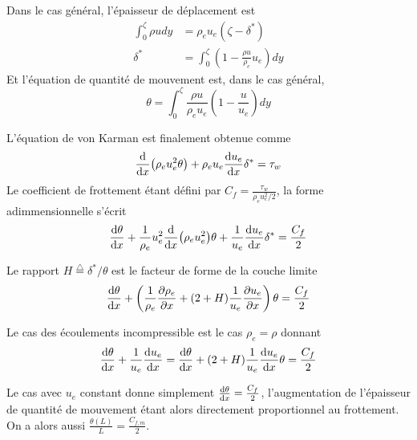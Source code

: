     Dans le cas général, l'épaisseur de déplacement est
    \begin{equation}
      \begin{aligned}
        \int_0^\zeta \rho u dy &= \rho_e u_e (\zeta - \delta^*)\\
        \delta^* &= \int_0^\zeta \left(1 - \frac{\rho u}{\rho_e}{u_e}\right)dy
      \end{aligned}
    \end{equation}
    Et l'équation de quantité de mouvement est, dans le cas général,
    \begin{equation}
      \theta = \int_0^\zeta \frac{\rho u}{\rho_e u_e} \left(1 - \frac{u}{u_e}\right) dy
    \end{equation}

    L'équation de von Karman est finalement obtenue comme
    \begin{equation}
      \dv{x}(\rho_e u_e^2 \theta) + \rho_e u_e \dv{u_e}{x} \delta^* = \tau_w
    \end{equation}
    Le coefficient de frottement étant défini par $C_f = \frac{\tau_w}{\rho_e u_e^2/2}$, la forme adimmensionnelle s'écrit
    \begin{equation}
      \dv{\theta}{x} + \frac{1}{\rho_e}{u_e^2} \dv{x}(\rho_e u_e^2) \theta + \frac{1}{u_e}\dv{u_e}{x} \delta^* = \frac{C_f}{2}
    \end{equation}

    Le rapport $H \overset{\triangle}{=} \delta^*/\theta$ est le facteur de forme de la couche limite
    \begin{equation}
      \dv{\theta}{x} + \left(\frac{1}{\rho_e}\pdv{\rho_e}{x} + (2+H) \frac{1}{u_e}\pdv{u_e}{x}\right)\theta = \frac{C_f}{2}
    \end{equation}

    Le cas des écoulements incompressible est le cas $\rho_e = \rho$ donnant
    \begin{equation}
      \dv{\theta}{x} + \frac{1}{u_e}\dv{u_e}{x}(2\theta + \delta^*) = \dv{\theta}{x} + (2+H) \frac{1}{u_e}\dv{u_e}{x} \theta = \frac{C_f}{2}
    \end{equation}

    Le cas avec $u_e$ constant donne simplement $\dv{\theta}{x} = \frac{C_f}{2}$, l'augmentation de l'épaisseur de quantité de mouvement étant alors directement proportionnel au frottement. On a alors aussi $\frac{\theta(L)}{L} = \frac{C_{f,m}}{2}$.
